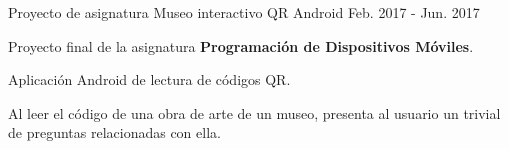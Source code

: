 \begin{cventries}
  \cventry
    {Proyecto de asignatura} %
    {Museo interactivo QR} %
    {Android} %
    {Feb. 2017 - Jun. 2017} %
    {
      \begin{cvitems} %
        \item {Proyecto final de la asignatura \textbf{Programación de Dispositivos Móviles}.}
        \item {Aplicación Android de lectura de códigos QR.}
        \item {Al leer el código de una obra de arte de un museo, presenta al usuario un trivial de preguntas relacionadas con ella.}
      \end{cvitems}
    }

\end{cventries}
